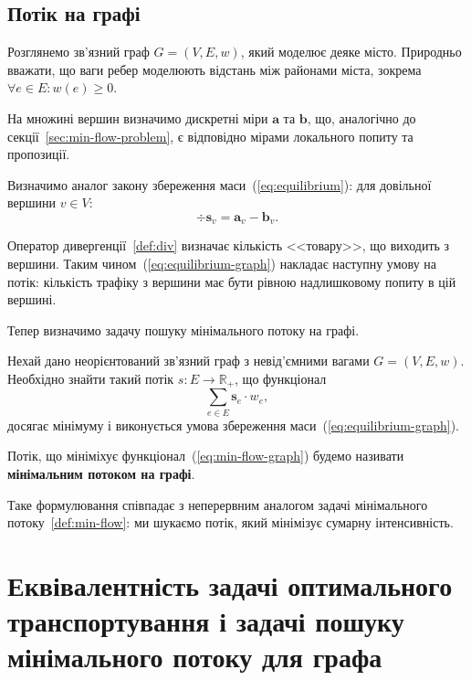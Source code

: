 \subsection{Потік на графі}
Розглянемо зв'язний граф $G = (V, E, w)$, який моделює деяке місто.
Природньо вважати, що ваги ребер моделюють відстань між районами міста, зокрема $\forall e \in E: w(e) \ge 0$.

На множині вершин визначимо дискретні міри $\mathbf a$ та $\mathbf b$, що, аналогічно до секції~\ref{sec:min-flow-problem}, є
відповідно мірами локального попиту та пропозиції.

Визначимо аналог закону збереження маси~(\ref{eq:equilibrium}): для довільної вершини $v \in V$:
\begin{equation}
    \label{eq:equilibrium-graph}
    \div{\mathbf{s}}_v = \mathbf{a}_v - \mathbf{b}_v.
\end{equation}

Оператор дивергенції~\ref{def:div} визначає кількість <<товару>>, що виходить з вершини.
Таким чином~(\ref{eq:equilibrium-graph}) накладає наступну умову на потік: кількість трафіку з вершини має бути рівною
надлишковому попиту в цій вершині.

Тепер визначимо задачу пошуку мінімального потоку на графі.

\begin{definition}
    Нехай дано неорієнтований зв'язний граф з невід'ємними вагами $G = (V, E, w)$. Необхідно знайти такий потік
    $s : E \to \mathbb{R}_+$, що функціонал
    \begin{equation}
        \label{eq:min-flow-graph}
        \sum_{e \in E} \mathbf{s}_e \cdot w_e,
    \end{equation}
    досягає мінімуму і виконується умова збереження маси~(\ref{eq:equilibrium-graph}). 

    Потік, що мініміхує функціонал~(\ref{eq:min-flow-graph}) будемо називати \textbf{мінімальним потоком на графі}.
\end{definition}

Таке формулювання співпадає з неперервним аналогом задачі мінімального потоку~\ref{def:min-flow}: ми шукаємо потік, який
мінімізує сумарну інтенсивність. 

\section{Еквівалентність задачі оптимального транспортування і задачі пошуку мінімального потоку для графа}

